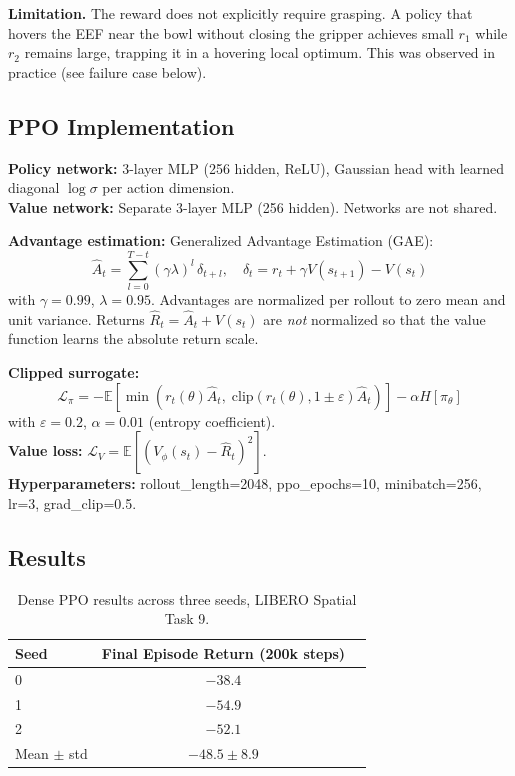 \documentclass[11pt,letterpaper]{article}
\begin{document}
\textbf{Limitation.} The reward does not explicitly require grasping. A policy that hovers the EEF near the bowl without closing the gripper achieves small $r_1$ while $r_2$ remains large, trapping it in a hovering local optimum. This was observed in practice (see failure case below).

\subsection{PPO Implementation}

\textbf{Policy network:} 3-layer MLP (256 hidden, ReLU), Gaussian head with learned diagonal $\log\sigma$ per action dimension.\\
\textbf{Value network:} Separate 3-layer MLP (256 hidden). Networks are not shared.

\textbf{Advantage estimation:} Generalized Advantage Estimation (GAE):
\[
  \hat{A}_t = \sum_{l=0}^{T-t} (\gamma\lambda)^l \,\delta_{t+l}, \quad
  \delta_t = r_t + \gamma V(s_{t+1}) - V(s_t)
\]
with $\gamma=0.99$, $\lambda=0.95$. Advantages are normalized per rollout to zero mean and unit variance. Returns $\hat{R}_t = \hat{A}_t + V(s_t)$ are \emph{not} normalized so that the value function learns the absolute return scale.

\textbf{Clipped surrogate:}
\[
  \mathcal{L}_\pi = -\mathbb{E}\!\left[\min\!\left(r_t(\theta)\hat{A}_t,\;\text{clip}(r_t(\theta),1\pm\varepsilon)\hat{A}_t\right)\right]
  - \alpha H[\pi_\theta]
\]
with $\varepsilon=0.2$, $\alpha=0.01$ (entropy coefficient).\\
\textbf{Value loss:} $\mathcal{L}_V = \mathbb{E}[(V_\phi(s_t) - \hat{R}_t)^2]$.\\
\textbf{Hyperparameters:} rollout\_length=2048, ppo\_epochs=10, minibatch=256, lr=3, grad\_clip=0.5.

\subsection{Results}

\begin{table}[h]
\centering
\begin{tabular}{lcc}
\toprule
Seed & Final Episode Return (200k steps) \\
\midrule
0    & $-38.4$ \\
1    & $-54.9$ \\
2    & $-52.1$ \\
\midrule
Mean $\pm$ std & $-48.5 \pm 8.9$ \\
\bottomrule
\end{tabular}
\caption{Dense PPO results across three seeds, LIBERO Spatial Task 9.}
\end{table}
\end{document}
